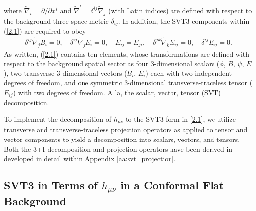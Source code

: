 %
where $\tilde{\nabla}_i=\partial/\partial x^i$ and  $\tilde{\nabla}^i=\delta^{ij}\tilde{\nabla}_j$  (with Latin indices) are defined with respect to the background three-space metric $\delta_{ij}$. In addition, the SVT3 components within (\ref{2.1}) are required to obey
%
\begin{eqnarray}
\delta^{ij}\tilde{\nabla}_j B_i = 0,\quad \delta^{ij}\tilde{\nabla}_j E_i = 0, \quad E_{ij}=E_{ji},\quad \delta^{jk}\tilde{\nabla}_kE_{ij} = 0, \quad \delta^{ij}E_{ij} = 0.
\label{2.2}
\label{APsvt3_rel}
\end{eqnarray}
%
As written, (\ref{2.1}) contains ten elements, whose transformations are defined with respect to the background spatial sector as four 3-dimensional scalars ($\phi$, $B$, $\psi$, $E$), two transverse 3-dimensional vectors ($B_i$, $E_i$) each with two independent degrees of freedom, and one symmetric 3-dimensional transverse-traceless tensor ($E_{ij}$) with two degrees of freedom. A la, the scalar, vector, tensor (SVT) decomposition. 

To implement the decomposition of $h_{\mu\nu}$ to the SVT3 form in \eqref{2.1}, we utilize transverse and transverse-traceless projection operators as applied to tensor and vector components to yield a decomposition into scalars, vectors, and tensors. Both the 3+1 decomposition and projection operators have been derived in developed in detail within Appendix \ref{aa:svt_projection}.
%
\subsection{SVT3 in Terms of $h_{\mu\nu}$ in a Conformal Flat Background}

